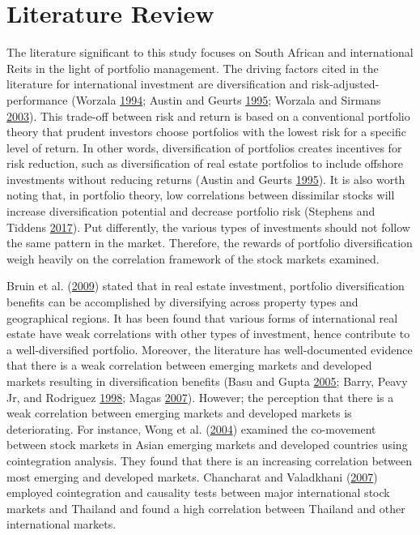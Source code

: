\documentclass[11pt,preprint, authoryear]{elsarticle}
\numberwithin{equation}{section}
\numberwithin{figure}{section}
\numberwithin{table}{section}
\begin{document}
\hypertarget{literature-review}{%
\section{\texorpdfstring{Literature Review
\label{Literature Review}}{Literature Review }}\label{literature-review}}

The literature significant to this study focuses on South African and
international Reits in the light of portfolio management. The driving
factors cited in the literature for international investment are
diversification and risk-adjusted-performance (Worzala
\protect\hyperlink{ref-worzala1994overseas}{1994}; Austin and Geurts
\protect\hyperlink{ref-austin1995risk}{1995}; Worzala and Sirmans
\protect\hyperlink{ref-worzala2003investing}{2003}). This trade-off
between risk and return is based on a conventional portfolio theory that
prudent investors choose portfolios with the lowest risk for a specific
level of return. In other words, diversification of portfolios creates
incentives for risk reduction, such as diversification of real estate
portfolios to include offshore investments without reducing returns
(Austin and Geurts \protect\hyperlink{ref-austin1995risk}{1995}). It is
also worth noting that, in portfolio theory, low correlations between
dissimilar stocks will increase diversification potential and decrease
portfolio risk (Stephens and Tiddens
\protect\hyperlink{ref-stephensinter2017}{2017}). Put differently, the
various types of investments should not follow the same pattern in the
market. Therefore, the rewards of portfolio diversification weigh
heavily on the correlation framework of the stock markets examined.

Bruin et al. (\protect\hyperlink{ref-bruin2009real}{2009}) stated that
in real estate investment, portfolio diversification benefits can be
accomplished by diversifying across property types and geographical
regions. It has been found that various forms of international real
estate have weak correlations with other types of investment, hence
contribute to a well-diversified portfolio. Moreover, the literature has
well-documented evidence that there is a weak correlation between
emerging markets and developed markets resulting in diversification
benefits (Basu and Gupta \protect\hyperlink{ref-basu2005benefits}{2005};
Barry, Peavy Jr, and Rodriguez
\protect\hyperlink{ref-barry1998performance}{1998}; Magas
\protect\hyperlink{ref-magas2007changing}{2007}). However; the
perception that there is a weak correlation between emerging markets and
developed markets is deteriorating. For instance, Wong et al.
(\protect\hyperlink{ref-wong2004relationship}{2004}) examined the
co-movement between stock markets in Asian emerging markets and
developed countries using cointegration analysis. They found that there
is an increasing correlation between most emerging and developed
markets. Chancharat and Valadkhani
(\protect\hyperlink{ref-chancharat2007empirical}{2007}) employed
cointegration and causality tests between major international stock
markets and Thailand and found a high correlation between Thailand and
other international markets.
\end{document}
